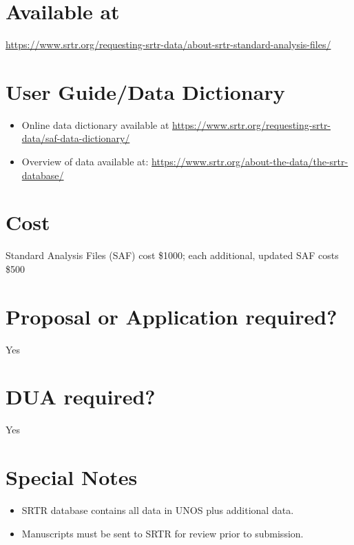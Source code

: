 \documentclass[
]{book}
\providecommand{\tightlist}{%
  \setlength{\itemsep}{0pt}\setlength{\parskip}{0pt}}
\begin{document}
\hypertarget{available-at-77}{%
\section{Available at}\label{available-at-77}}

\url{https://www.srtr.org/requesting-srtr-data/about-srtr-standard-analysis-files/}

\hypertarget{user-guidedata-dictionary-77}{%
\section{User Guide/Data Dictionary}\label{user-guidedata-dictionary-77}}

\begin{itemize}
\tightlist
\item
  Online data dictionary available at \url{https://www.srtr.org/requesting-srtr-data/saf-data-dictionary/}
\item
  Overview of data available at: \url{https://www.srtr.org/about-the-data/the-srtr-database/}
\end{itemize}

\hypertarget{cost-77}{%
\section{Cost}\label{cost-77}}

Standard Analysis Files (SAF) cost \$1000; each additional, updated SAF costs \$500

\hypertarget{proposal-or-application-required-77}{%
\section{Proposal or Application required?}\label{proposal-or-application-required-77}}

Yes

\hypertarget{dua-required-77}{%
\section{DUA required?}\label{dua-required-77}}

Yes

\hypertarget{special-notes-77}{%
\section{Special Notes}\label{special-notes-77}}

\begin{itemize}
\tightlist
\item
  SRTR database contains all data in UNOS plus additional data.
\item
  Manuscripts must be sent to SRTR for review prior to submission.
\end{itemize}
\end{document}
